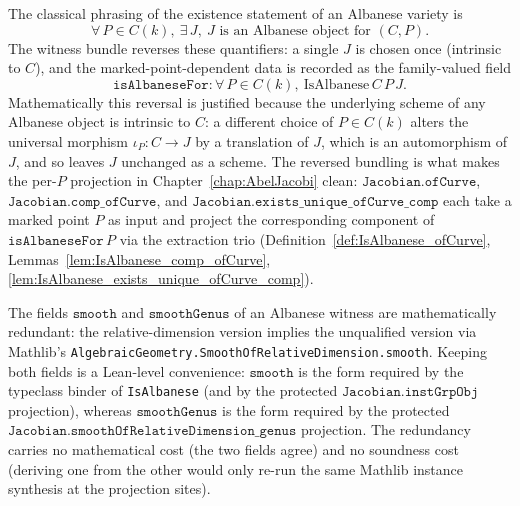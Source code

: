 \begin{remark}
  \label{rem:JacobianWitness_quantifier_order}
  The classical phrasing of the existence statement of an Albanese variety is
  \[
    \forall\, P \in C(k),\ \exists\, J,\ J \text{ is an Albanese object for } (C, P).
  \]
  The witness bundle reverses these quantifiers: a single \(J\) is chosen once (intrinsic to \(C\)), and the marked-point-dependent data is recorded as the family-valued field
  \[
    \mathtt{isAlbaneseFor} \colon \forall\, P \in C(k),\ \mathrm{IsAlbanese}\,C\,P\,J.
  \]
  Mathematically this reversal is justified because the underlying scheme of any Albanese object is intrinsic to \(C\): a different choice of \(P \in C(k)\) alters the universal morphism \(\iota_P \colon C \to J\) by a translation of \(J\), which is an automorphism of \(J\), and so leaves \(J\) unchanged as a scheme. The reversed bundling is what makes the per-\(P\) projection in Chapter~\ref{chap:AbelJacobi} clean: \(\mathtt{Jacobian.ofCurve}\), \(\mathtt{Jacobian.comp\_ofCurve}\), and \(\mathtt{Jacobian.exists\_unique\_ofCurve\_comp}\) each take a marked point \(P\) as input and project the corresponding component of \(\mathtt{isAlbaneseFor}\,P\) via the extraction trio (Definition~\ref{def:IsAlbanese_ofCurve}, Lemmas~\ref{lem:IsAlbanese_comp_ofCurve}, \ref{lem:IsAlbanese_exists_unique_ofCurve_comp}).
\end{remark}
\begin{remark}
  \label{rem:JacobianWitness_smooth_redundancy}
  The fields \(\mathtt{smooth}\) and \(\mathtt{smoothGenus}\) of an Albanese witness are mathematically redundant: the relative-dimension version implies the unqualified version via Mathlib's \texttt{AlgebraicGeometry.SmoothOfRelativeDimension.smooth}. Keeping both fields is a Lean-level convenience: \(\mathtt{smooth}\) is the form required by the typeclass binder of \texttt{IsAlbanese} (and by the protected \(\mathtt{Jacobian.instGrpObj}\) projection), whereas \(\mathtt{smoothGenus}\) is the form required by the protected \(\mathtt{Jacobian.smoothOfRelativeDimension\_genus}\) projection. The redundancy carries no mathematical cost (the two fields agree) and no soundness cost (deriving one from the other would only re-run the same Mathlib instance synthesis at the projection sites).
\end{remark}
